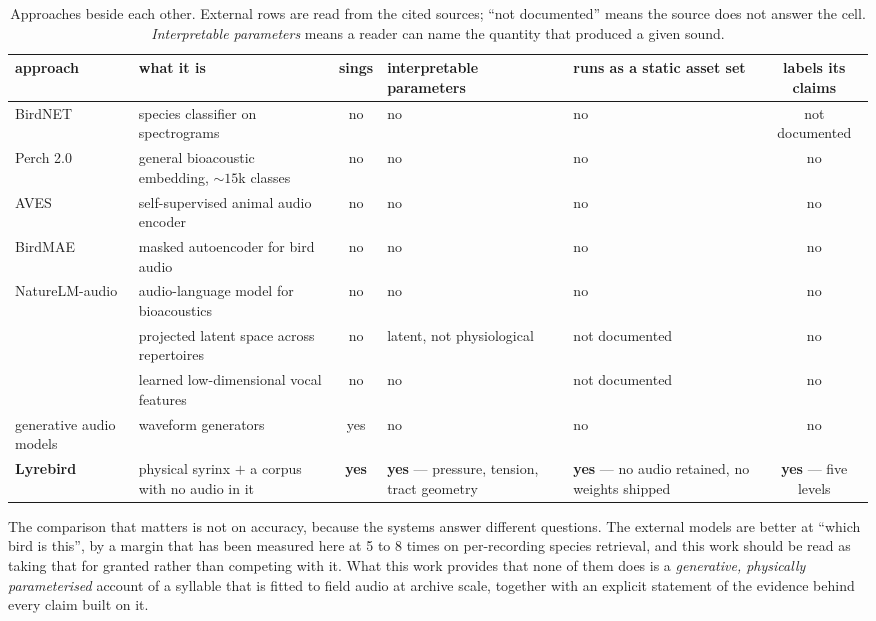 \documentclass[10pt,twocolumn,a4paper]{article}
\begin{document}
\begin{table}[t]
\centering
\small
\caption{Approaches beside each other. External rows are read from the cited sources;
``not documented'' means the source does not answer the cell. \emph{Interpretable
parameters} means a reader can name the quantity that produced a given sound.}
\label{tab:positioning}
\begin{tabular}{L{2.9cm} L{3.5cm} c L{2.5cm} L{2.6cm} c}
\toprule
approach & what it is & sings & interpretable parameters & runs as a static asset set & labels its claims \\
\midrule
BirdNET \citep{birdnet2021} & species classifier on spectrograms & no & no & no & not documented \\
Perch 2.0 \citep{perch2} & general bioacoustic embedding, ${\sim}15$k classes & no & no & no & no \\
AVES \citep{aves2022} & self-supervised animal audio encoder & no & no & no & no \\
BirdMAE \citep{birdmae2025} & masked autoencoder for bird audio & no & no & no & no \\
NatureLM-audio \citep{naturelm2024} & audio-language model for bioacoustics & no & no & no & no \\
\citet{sainburg2020} & projected latent space across repertoires & no & latent, not physiological & not documented & no \\
\citet{goffinet2021} & learned low-dimensional vocal features & no & no & not documented & no \\
generative audio models & waveform generators & yes & no & no & no \\
\textbf{Lyrebird} & physical syrinx $+$ a corpus with no audio in it & \textbf{yes} & \textbf{yes} --- pressure, tension, tract geometry & \textbf{yes} --- no audio retained, no weights shipped & \textbf{yes} --- five levels \\
\bottomrule
\end{tabular}
\end{table}

The comparison that matters is not on accuracy, because the systems answer different
questions. The external models are better at ``which bird is this'', by a margin that has
been measured here at 5 to 8 times on per-recording species retrieval, and this work should
be read as taking that for granted rather than competing with it. What this work provides
that none of them does is a \emph{generative, physically parameterised} account of a syllable
that is fitted to field audio at archive scale, together with an explicit statement of the
evidence behind every claim built on it.
\end{document}
